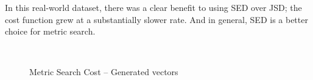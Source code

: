 
In this real-world dataset, there was a clear benefit to using SED over JSD; the cost function grew at a substantially slower rate.  And in general, SED is a better choice for metric search.  

\begin{figure}
        \centering
        ~ 
\caption[Metric Search Cost -- Generated vectors]{Metric Search Cost -- Generated vectors}
\end{figure}